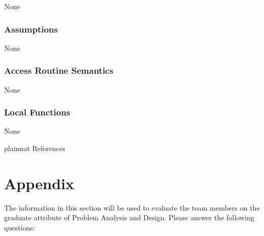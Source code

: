 \documentclass[12pt, titlepage]{article}
\begin{document}
None

\subsubsection{Assumptions}

None

\subsubsection{Access Routine Semantics}

None

\subsubsection{Local Functions}

None

\newpage


 {plainnat}
 {References}

\newpage

\section{Appendix} \label{Appendix}


The information in this section will be used to evaluate the team members on the
graduate attribute of Problem Analysis and Design.  Please answer the following questions:
\end{document}
